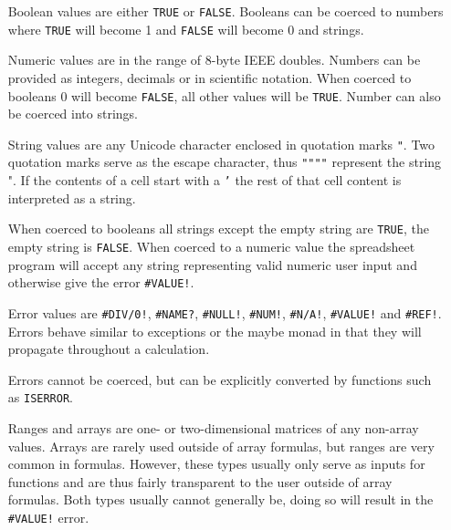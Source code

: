 \documentclass[12pt,a4paper,onecolumn,oneside]{memoir}
\newcommand{\f}[1]{\texttt{#1}}
\begin{document}
\begin{itemize}
\item[Boolean] values are either \f{TRUE} or \f{FALSE}. Booleans can be coerced to numbers where \f{TRUE} will become 1 and \f{FALSE} will become 0 and strings.
\item[Numeric] values are in the range of 8-byte IEEE doubles. Numbers can be provided as integers, decimals or in scientific notation.
When coerced to booleans 0 will become \f{FALSE}, all other values will be \f{TRUE}. Number can also be coerced into strings.
\item[String] values are any Unicode character enclosed in quotation marks \f{"}.
Two quotation marks serve as the escape character, thus \f{""""} represent the string ".
If the contents of a cell start with a \texttt{'} the rest of that cell content is interpreted as a string.

When coerced to booleans all strings except the empty string are \f{TRUE}, the empty string is \f{FALSE}.
When coerced to a numeric value the spreadsheet program will accept any string representing valid numeric user input and otherwise give the error \f{\#VALUE!}.
\item[Error] values are \f{\#DIV/0!}, \f{\#NAME?}, \f{\#NULL!}, \f{\#NUM!}, \f{\#N/A!}, \f{\#VALUE!} and \f{\#REF!}.
Errors behave similar to exceptions or the maybe monad in that they will propagate throughout a calculation.

Errors cannot be coerced, but can be explicitly converted by functions such as \f{ISERROR}.

\item[Ranges and arrays] are one- or two-dimensional matrices of any non-array values. Arrays are rarely used outside of array formulas, but ranges are very common in formulas.
However, these types usually only serve as inputs for functions and are thus fairly transparent to the user outside of array formulas.
Both types usually cannot generally be, doing so will result in the \f{\#VALUE!} error.
\end{itemize}
\end{document}
